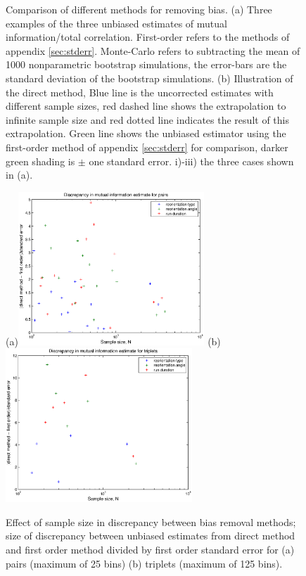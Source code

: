 \documentclass[12pt]{article}
\begin{document}
\begin{figure}
\begin{center}
  \end{center}
  \caption{Comparison of different methods for removing bias. (a) Three examples of the three unbiased estimates of mutual information/total correlation. First-order refers to the methods of appendix \ref{sec:stderr}. Monte-Carlo refers to subtracting the mean of 1000 nonparametric bootstrap simulations, the error-bars are the standard deviation of the bootstrap simulations. (b) Illustration of the direct method, Blue line is the uncorrected estimates with different sample sizes, red dashed line shows the extrapolation to infinite sample size and red dotted line indicates the result of this extrapolation. Green line shows the unbiased estimator using the first-order method of appendix \ref{sec:stderr} for comparison, darker green shading is $\pm$ one standard error. i)-iii) the three cases shown in (a).} \label{fig:biascomp}
\end{figure}

\begin{figure}
  \begin{center}
    (a)\includegraphics[width=7cm]{discpair.eps}
    (b)\includegraphics[width=7cm]{disctrip.eps}
  \end{center}
  \caption{Effect of sample size in discrepancy between bias removal methods; size of discrepancy between unbiased estimates from direct method and first order method divided by first order standard error for (a) pairs (maximum of 25 bins) (b) triplets (maximum of 125 bins).} \label{fig:discrep}
\end{figure}
\end{document}
